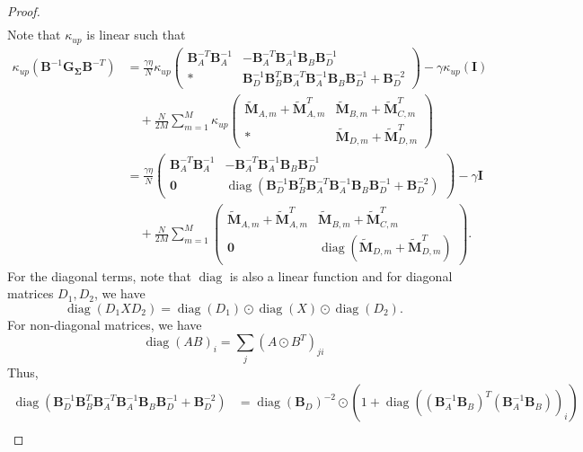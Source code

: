 \documentclass[a4paper, 11pt, oneside]{scrartcl}
\theoremstyle{break}
\DeclareMathOperator{\diag}{diag}
\newcommand{\matr}[1]{\boldsymbol{#1}}
\numberwithin{equation}{section}
\begin{document}
\begin{proof}
\begin{align*}
						\end{align*}
						Note that $\kappa_{up}$ is linear such that
						\begin{align*}
							\kappa_{up}(\matr{B}^{-1} \matr{G_{\Sigma}} \matr{B}^{-T}) &= \frac{\gamma \eta}{N} \kappa_{up} \begin{pmatrix} \matr{B}_A^{-T} \matr{B}_A^{-1} & -\matr{B}_A^{-T} \matr{B}_A^{-1} \matr{B}_B \matr{B}_D^{-1} \\ * & \matr{B}_D^{-1} \matr{B}_B^T \matr{B}_A^{-T} \matr{B}_A^{-1} \matr{B}_B \matr{B}_D^{-1} + \matr{B}_D^{-2} \end{pmatrix} - \gamma \kappa_{up}(\matr{I}) \\
							&\quad + \frac{N}{2 M} \sum_{m=1}^M \kappa_{up} \begin{pmatrix} \matr{\tilde{M}}_{A, m} + \matr{\tilde{M}}_{A, m}^T & \matr{\tilde{M}}_{B, m} + \matr{\tilde{M}}_{C, m}^T \\ * & \matr{\tilde{M}}_{D, m} + \matr{\tilde{M}}_{D, m}^T \end{pmatrix} \\
							&= \frac{\gamma \eta}{N} \begin{pmatrix} \matr{B}_A^{-T} \matr{B}_A^{-1} & -\matr{B}_A^{-T} \matr{B}_A^{-1} \matr{B}_B \matr{B}_D^{-1} \\ \matr{0} & \diag(\matr{B}_D^{-1} \matr{B}_B^T \matr{B}_A^{-T} \matr{B}_A^{-1} \matr{B}_B \matr{B}_D^{-1} + \matr{B}_D^{-2}) \end{pmatrix} - \gamma \matr{I} \\
							&\quad + \frac{N}{2 M} \sum_{m=1}^M \begin{pmatrix} \matr{\tilde{M}}_{A, m} + \matr{\tilde{M}}_{A, m}^T & \matr{\tilde{M}}_{B, m} + \matr{\tilde{M}}_{C, m}^T \\ \matr{0} & \diag(\matr{\tilde{M}}_{D, m} + \matr{\tilde{M}}_{D, m}^T) \end{pmatrix}.
						\end{align*}
						For the diagonal terms, note that $\diag$ is also a linear function and for diagonal matrices $D_1, D_2$, we have
						$$\diag(D_1 X D_2) = \diag(D_1) \odot \diag(X) \odot \diag(D_2).$$
						For non-diagonal matrices, we have
						$$\diag(A B)_i = \sum_j (A \odot B^T)_{ji}$$
						Thus, 
						\begin{align*}
							\diag(\matr{B}_D^{-1} \matr{B}_B^T \matr{B}_A^{-T} \matr{B}_A^{-1} \matr{B}_B \matr{B}_D^{-1} + \matr{B}_D^{-2}) &= \diag(\matr{B}_D)^{-2} \odot (1 + \diag((\matr{B}_A^{-1} \matr{B}_B)^T (\matr{B}_A^{-1} \matr{B}_B))_i) \\

\end{align*}
\end{proof}
\end{document}

